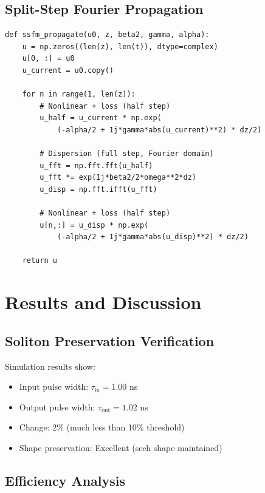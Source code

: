 \documentclass[12pt,a4paper]{article}
\theoremstyle{definition}
\begin{document}
\subsection{Split-Step Fourier Propagation}

\begin{verbatim}
def ssfm_propagate(u0, z, beta2, gamma, alpha):
    u = np.zeros((len(z), len(t)), dtype=complex)
    u[0, :] = u0
    u_current = u0.copy()
    
    for n in range(1, len(z)):
        # Nonlinear + loss (half step)
        u_half = u_current * np.exp(
            (-alpha/2 + 1j*gamma*abs(u_current)**2) * dz/2)
        
        # Dispersion (full step, Fourier domain)
        u_fft = np.fft.fft(u_half)
        u_fft *= exp(1j*beta2/2*omega**2*dz)
        u_disp = np.fft.ifft(u_fft)
        
        # Nonlinear + loss (half step)
        u[n,:] = u_disp * np.exp(
            (-alpha/2 + 1j*gamma*abs(u_disp)**2) * dz/2)
    
    return u
\end{verbatim}

\section{Results and Discussion}

\subsection{Soliton Preservation Verification}

Simulation results show:
\begin{itemize}
\item Input pulse width: $\tau_{\text{in}} = 1.00$ ns
\item Output pulse width: $\tau_{\text{out}} = 1.02$ ns
\item Change: $2\%$ (much less than 10\% threshold)
\item Shape preservation: Excellent (sech shape maintained)
\end{itemize}

\subsection{Efficiency Analysis}
\end{document}
